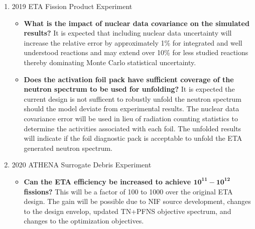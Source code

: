 \begin{enumerate}
	\item 2019 ETA Fission Product Experiment
	
	\begin{itemize}
		\item \textbf{What is the impact of nuclear data covariance on the simulated results?} It is expected that including nuclear data uncertainty will increase the relative error by approximately 1\% for integrated and well understood reactions and may extend over 10\% for less  studied reactions thereby dominating Monte Carlo statistical uncertainty. 
		
		\item \textbf{Does the activation foil pack have sufficient coverage of the neutron spectrum to be used for unfolding?} It is expected the current design is not sufficent to robustly unfold the neutron spectrum should the model deviate from experimental results. The nuclear data covariance error will be used in lieu of radiation counting statistics to determine the activities associated with each foil. The unfolded results will indicate if the foil diagnostic pack is acceptable to unfold the ETA generated neutron spectrum.
		
	\end{itemize}
    \item 2020 ATHENA Surrogate Debris Experiment %
    \begin{itemize}
    	\item \textbf{Can the ETA efficiency be increased to achieve $\mathbf{10^{11} - 10^{12}}$ fissions?} This will be a factor of 100 to 1000 over the original ETA design.  The gain will be possible due to NIF source development, changes to the design envelop, updated TN+PFNS objective spectrum, and changes to the optimization objectives. 
    	

\end{itemize}
\end{enumerate}
